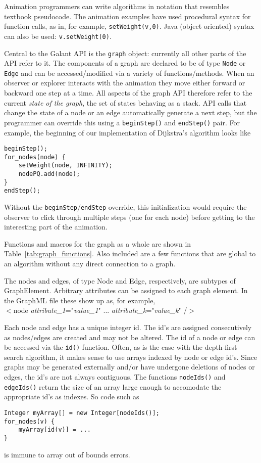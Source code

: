Animation programmers can write algorithms in notation that resembles
textbook pseudocode.
The animation examples have used procedural syntax for function calls, as in, for example,
\texttt{setWeight(v,0)}.
Java (object oriented) syntax can also be used: \texttt{v.setWeight(0)}.

Central to the Galant API is the \texttt{graph} object: currently all other
parts of the API refer to it.
The components of a graph are declared to be of type \texttt{Node} or
\texttt{Edge} and can be accessed/modified via a variety of
functions/methods.
When an observer or explorer interacts with the animation they move either
forward or backward one step at a time.
All aspects of the graph API therefore refer to the current \emph{state of
  the graph}, the set of states behaving as a stack.
API calls that change the state of a node or an edge automatically
generate a next step,
but the programmer can override this using a \texttt{beginStep()} and
\texttt{endStep()} pair. For example, the beginning of our implementation of
Dijkstra's algorithm looks like
\begin{verbatim}
beginStep();
for_nodes(node) {
    setWeight(node, INFINITY);
    nodePQ.add(node);
}
endStep();
\end{verbatim}
Without the \texttt{beginStep}/\texttt{endStep}
override, this initialization would require the observer to click
through multiple steps (one for each node) before getting to the interesting
part of the animation.



Functions and macros for the graph as a whole are shown in Table~\ref{tab:graph_functions}.
Also included are a few functions that are global to an algorithm without
any direct connection to a graph.

The nodes and edges, of type \textsf{Node} and \textsf{Edge}, respectively,
are subtypes of \textsf{GraphElement}.
Arbitrary attributes can be assigned to each graph element. In the GraphML file
these show up as, for example,\\
\hspace*{3em}
\textsf{
$<$node \emph{attribute\_1}="\emph{value\_1}" ... \emph{attribute\_k}="\emph{value\_k}" /$>$
}

Each node and edge has a unique integer id.
The id's are assigned consecutively as nodes/edges are created
and may not be altered.
The id of a node or edge can be accessed via the \texttt{id()} function.
Often, as is the case with the depth-first search algorithm, it makes sense to use
arrays indexed by node or edge id's.
Since graphs may be generated externally and/or have undergone deletions of nodes or
edges, the id's are not always contiguous.
The functions \texttt{nodeIds()} and \texttt{edgeIds()} return the size of an array
large enough to accomodate the appropriate id's as indexes. So code such as
\begin{verbatim}
Integer myArray[] = new Integer[nodeIds()];
for_nodes(v) {
    myArray[id(v)] = ...
}
\end{verbatim}
is immune to array out of bounds errors.

